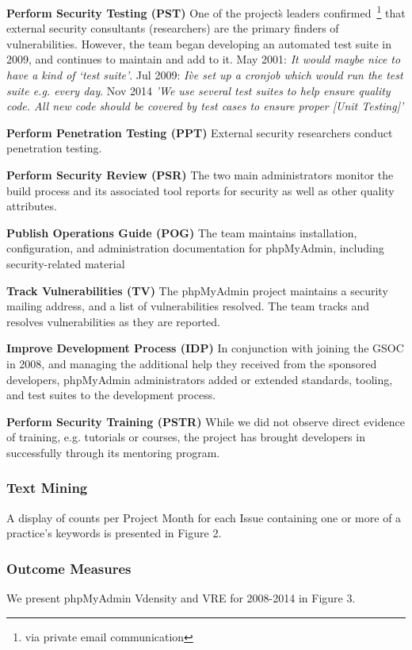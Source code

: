 \textbf{Perform Security Testing (PST)}
One of the project\`s leaders confirmed~\footnote{via private email communication} that external security consultants (researchers) are the primary finders of vulnerabilities. However, the team began developing an automated test suite in 2009, and continues to maintain and add to it. May 2001:  \textit{It would maybe nice to have a kind of `test suite'}. Jul 2009: \textit{I\`ve set up a cronjob which would run the test suite e.g. every day}. Nov 2014 \textit{'We use several test suites to help ensure quality code. All new code should be covered by test cases to ensure proper [Unit Testing]'}

\textbf{Perform Penetration Testing (PPT)}
External security researchers conduct penetration testing. 

\textbf{Perform Security Review (PSR)}
The two main administrators monitor the build process and its associated tool reports for security as well as other quality attributes.

\textbf{Publish Operations Guide (POG)}
The team maintains installation, configuration, and administration documentation for phpMyAdmin, including security-related material%

\textbf{Track Vulnerabilities (TV)}
The phpMyAdmin project maintains a security mailing address, and a list of vulnerabilities resolved. The team tracks and resolves vulnerabilities as they are reported.

\textbf{Improve Development Process (IDP)} In conjunction with joining the GSOC in 2008, and managing the additional help they received from the sponsored developers, phpMyAdmin administrators added or extended standards, tooling, and test suites to the development process.

\textbf{Perform Security Training (PSTR)} 
While we did not observe direct evidence of training, e.g. tutorials or courses, the project has brought developers in successfully through its mentoring program. 

\subsubsection{Text Mining}
A display of counts per Project Month for each Issue containing one or more of a practice’s keywords is presented in Figure 2.



\subsubsection{Outcome Measures}
We present phpMyAdmin Vdensity and VRE for 2008-2014 in Figure 3.  


